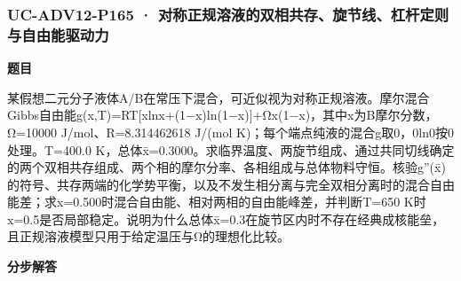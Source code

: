 \documentclass[UTF8,11pt,a4paper]{ctexart}
\begin{document}
\subsubsection*{UC-ADV12-P165 · 对称正规溶液的双相共存、旋节线、杠杆定则与自由能驱动力}
\noindent\textbf{题目}\par
某假想二元分子液体A/B在常压下混合，可近似视为对称正规溶液。摩尔混合Gibbs自由能g(x,T)=RT[xlnx+(1−x)ln(1−x)]+Ωx(1−x)，其中x为B摩尔分数，Ω=10000 J/mol、R=8.314462618 J/(mol K)；每个端点纯液的混合g取0，0ln0按0处理。T=400.0 K，总体x̄=0.3000。求临界温度、两旋节组成、通过共同切线确定的两个双相共存组成、两个相的摩尔分率、各相组成与总体物料守恒。核验g''(x̄)的符号、共存两端的化学势平衡，以及不发生相分离与完全双相分离时的混合自由能差；求x=0.500时混合自由能、相对两相的自由能峰差，并判断T=650 K时x=0.5是否局部稳定。说明为什么总体x̄=0.3在旋节区内时不存在经典成核能垒，且正规溶液模型只用于给定温压与Ω的理想化比较。\par
\medskip\noindent\textbf{分步解答}
\end{document}
